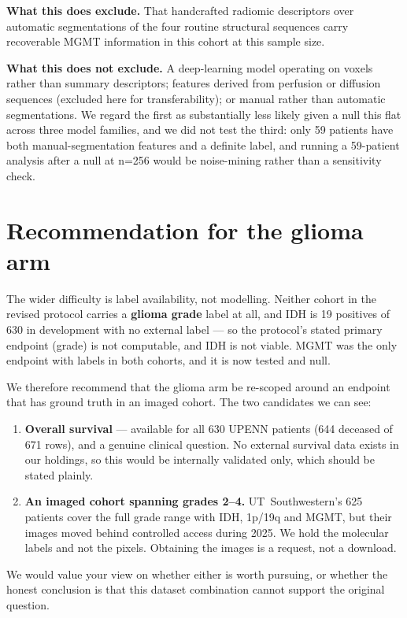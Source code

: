 \documentclass[11pt,a4paper]{article}
\begin{document}
\textbf{What this does exclude.} That handcrafted radiomic descriptors over automatic
segmentations of the four routine structural sequences carry recoverable MGMT information
in this cohort at this sample size.

\textbf{What this does not exclude.} A deep-learning model operating on voxels rather than
summary descriptors; features derived from perfusion or diffusion sequences (excluded here
for transferability); or manual rather than automatic segmentations. We regard the first as
substantially less likely given a null this flat across three model families, and we did
not test the third: only 59 patients have both manual-segmentation features and a definite
label, and running a 59-patient analysis after a null at n=256 would be noise-mining rather
than a sensitivity check.

\section{Recommendation for the glioma arm}

The wider difficulty is label availability, not modelling. Neither cohort in the revised
protocol carries a \textbf{glioma grade} label at all, and IDH is 19 positives of 630 in
development with no external label --- so the protocol's stated primary endpoint (grade) is
not computable, and IDH is not viable. MGMT was the only endpoint with labels in both
cohorts, and it is now tested and null.

We therefore recommend that the glioma arm be re-scoped around an endpoint that has
ground truth in an imaged cohort. The two candidates we can see:

\begin{enumerate}[leftmargin=1.6em,nosep]
\item \textbf{Overall survival} --- available for all 630 UPENN patients (644 deceased of
671 rows), and a genuine clinical question. No external survival data exists in our
holdings, so this would be internally validated only, which should be stated plainly.
\item \textbf{An imaged cohort spanning grades 2--4.} UT~Southwestern's 625 patients cover
the full grade range with IDH, 1p/19q and MGMT, but their images moved behind controlled
access during 2025. We hold the molecular labels and not the pixels. Obtaining the images
is a request, not a download.
\end{enumerate}

\noindent
We would value your view on whether either is worth pursuing, or whether the honest
conclusion is that this dataset combination cannot support the original question.
\end{document}
